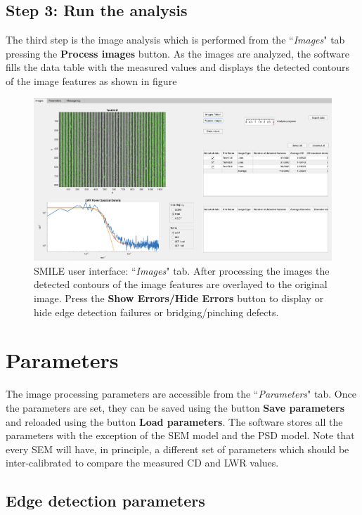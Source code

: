 \documentclass[12pt, a4paper, openany]{report}
\begin{document}
\section{Step 3: Run the analysis}
The third step is the image analysis which is performed from the ``\emph{Images}" tab pressing the \textbf{Process images} button. As the images are analyzed, the software fills the data table with the measured values and displays the detected contours of the image features as shown in figure \
\begin{figure}[t]
	\includegraphics[width=\textwidth]{figures/GUI_01B.png}
	\caption{SMILE user interface: ``\emph{Images}" tab. After processing the images the detected contours of the image features are overlayed to the original image. Press the \textbf{Show Errors/Hide Errors} button to display or hide edge detection failures or bridging/pinching defects.}
	\label{fig:GUI_01B}
\end{figure}
\chapter{Parameters}
The image processing parameters are accessible from the ``\emph{Parameters}" tab. Once the parameters are set, they can be saved using the button \textbf{Save parameters} and reloaded using the button \textbf{Load parameters}. The software stores all the parameters with the exception of the SEM model and the PSD model. Note that every SEM will have, in principle, a different set of parameters which should be inter-calibrated to compare the measured CD and LWR values.
\section{Edge detection parameters}
\end{document}
